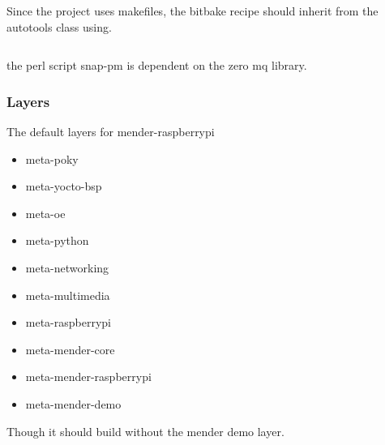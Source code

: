 \documentclass[../../main.tex]{subfiles}
\begin{document}
Since the project uses makefiles, the bitbake recipe should inherit from the autotools class using.
\inputminted{bitbake}{/home/aske/Bachelor/mender-raspberrypi/meta-mclur/recipes-mclurs/mclurs/mclurs_git.bb}


the perl script snap-pm is dependent on the zero mq library.


\subsubsection{Layers}%
\label{ssub:layers}

The default layers for mender-raspberrypi
\begin{itemize}
	\item meta-poky
	\item meta-yocto-bsp
	\item meta-oe
	\item meta-python
	\item meta-networking
	\item meta-multimedia
	\item meta-raspberrypi
	\item meta-mender-core
	\item meta-mender-raspberrypi
	\item meta-mender-demo
\end{itemize}
Though it should build without the mender demo layer.


\end{document}
